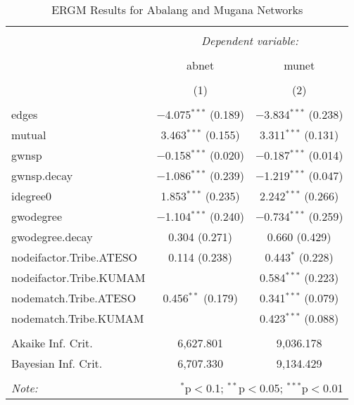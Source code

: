 
\begin{table}[!htbp] \centering 
  \caption{ERGM Results for Abalang and Mugana Networks} 
  \label{} 
\begin{tabular}{@{\extracolsep{5pt}}lcc} 
\\[-1.8ex]\hline 
\hline \\[-1.8ex] 
 & \multicolumn{2}{c}{\textit{Dependent variable:}} \\ 
\cline{2-3} 
\\[-1.8ex] & abnet & munet \\ 
\\[-1.8ex] & (1) & (2)\\ 
\hline \\[-1.8ex] 
 edges & $-$4.075$^{***}$ (0.189) & $-$3.834$^{***}$ (0.238) \\ 
  mutual & 3.463$^{***}$ (0.155) & 3.311$^{***}$ (0.131) \\ 
  gwnsp & $-$0.158$^{***}$ (0.020) & $-$0.187$^{***}$ (0.014) \\ 
  gwnsp.decay & $-$1.086$^{***}$ (0.239) & $-$1.219$^{***}$ (0.047) \\ 
  idegree0 & 1.853$^{***}$ (0.235) & 2.242$^{***}$ (0.266) \\ 
  gwodegree & $-$1.104$^{***}$ (0.240) & $-$0.734$^{***}$ (0.259) \\ 
  gwodegree.decay & 0.304 (0.271) & 0.660 (0.429) \\ 
  nodeifactor.Tribe.ATESO & 0.114 (0.238) & 0.443$^{*}$ (0.228) \\ 
  nodeifactor.Tribe.KUMAM &  & 0.584$^{***}$ (0.223) \\ 
  nodematch.Tribe.ATESO & 0.456$^{**}$ (0.179) & 0.341$^{***}$ (0.079) \\ 
  nodematch.Tribe.KUMAM &  & 0.423$^{***}$ (0.088) \\ 
 \hline \\[-1.8ex] 
Akaike Inf. Crit. & 6,627.801 & 9,036.178 \\ 
Bayesian Inf. Crit. & 6,707.330 & 9,134.429 \\ 
\hline 
\hline \\[-1.8ex] 
\textit{Note:}  & \multicolumn{2}{r}{$^{*}$p$<$0.1; $^{**}$p$<$0.05; $^{***}$p$<$0.01} \\ 
\end{tabular} 
\end{table} 

